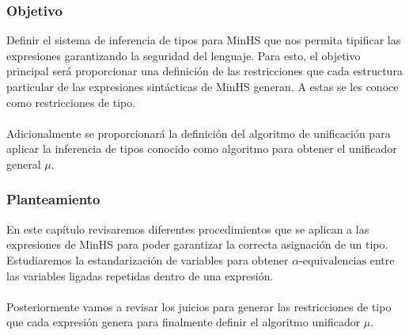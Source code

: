 \subsubsection{Objetivo}
Definir el sistema de inferencia de tipos para \textsf{MinHS} que nos permita tipificar las expresiones garantizando la seguridad del lenguaje. Para esto, el objetivo principal será proporcionar una definición de las restricciones que cada estructura particular de las expresiones sintácticas de \textsf{MinHS} generan. A estas se les conoce como restricciones de tipo. \\\\
Adicionalmente se proporcionará la definición del algoritmo de unificación para aplicar la inferencia de tipos conocido como algoritmo para obtener el unificador general \textbf{$\mu$}.


\subsubsection{Planteamiento}
En este capítulo  revisaremos diferentes  procedimientos que se aplican a las expresiones de \textsf{MinHS} para poder garantizar la correcta  asignación de un tipo.
Estudiaremos la estandarización de variables para obtener $\alpha\text{-equivalencias}$ entre las variables ligadas repetidas dentro de una expresión.\\\\
Posteriormente vamos a revisar los juicios para generar las restricciones de tipo que cada expresión genera para finalmente definir el algoritmo unificador $\mu$.


